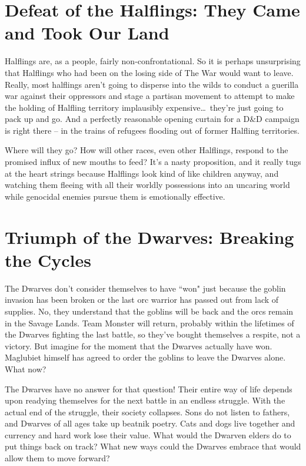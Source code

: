 \section{Defeat of the Halflings: They Came and Took Our Land}

Halflings are, as a people, fairly non-confrontational. So it is perhaps unsurprising that Halflings who had been on the losing side of The War would want to leave. Really, most halflings aren't going to disperse into the wilds to conduct a guerilla war against their oppressors and stage a partisan movement to attempt to make the holding of Halfling territory implausibly expensive\ldots\  they're just going to pack up and go. And a perfectly reasonable opening curtain for a D\&D campaign is right there -- in the trains of refugees flooding out of former Halfling territories.

Where will they go? How will other races, even other Halflings, respond to the promised influx of new mouths to feed? It's a nasty proposition, and it really tugs at the heart strings because Halflings look kind of like children anyway, and watching them fleeing with all their worldly possessions into an uncaring world while genocidal enemies pursue them is emotionally effective.

\section{Triumph of the Dwarves: Breaking the Cycles}

The Dwarves don't consider themselves to have ``won" just because the goblin invasion has been broken or the last orc warrior has passed out from lack of supplies. No, they understand that the goblins will be back and the orcs remain in the Savage Lands. Team Monster will return, probably within the lifetimes of the Dwarves fighting the last battle, so they've bought themselves a respite, not a victory. But imagine for the moment that the Dwarves actually have won. Maglubiet himself has agreed to order the goblins to leave the Dwarves alone. What now?

The Dwarves have no answer for that question! Their entire way of life depends upon readying themselves for the next battle in an endless struggle. With the actual end of the struggle, their society collapses. Sons do not listen to fathers, and Dwarves of all ages take up beatnik poetry. Cats and dogs live together and currency and hard work lose their value. What would the Dwarven elders do to put things back on track? What new ways could the Dwarves embrace that would allow them to move forward?

